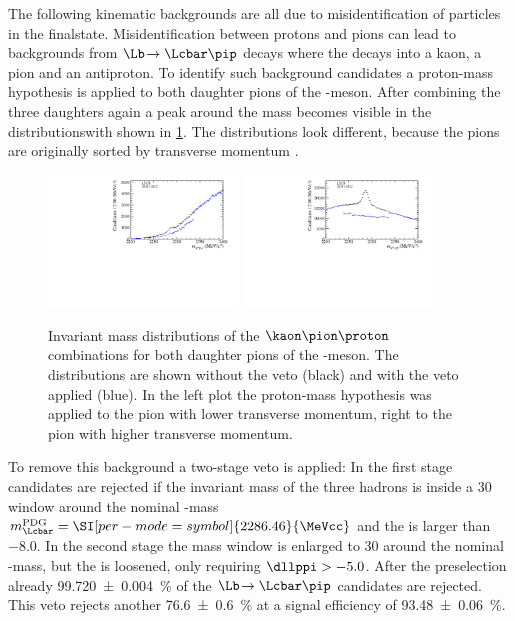 The following kinematic backgrounds are all due to misidentification of particles in the finalstate.
Misidentification between protons and pions can lead to backgrounds from $\Lb\!\to\Lcbar\pip$ decays where the \Lcbar decays into a kaon, a pion and an antiproton.
To identify such background candidates a proton-mass hypothesis is applied to both daughter pions of the \Dm-meson.
After combining the three \D daughters again a peak around the \Lc mass becomes visible in the distributionswith shown in \cref{fig:LcVeto}.
The distributions look different, because the pions are originally sorted by transverse momentum \pt.
\begin{figure}[tbp]
    \centering
    \includegraphics[width=0.45\textwidth]{06selection/figs/LcHypo1.pdf}
    \includegraphics[width=0.45\textwidth]{06selection/figs/LcHypo2.pdf}
    \caption{Invariant mass distributions of the $\kaon\pion\proton$ combinations for both daughter pions of the \Dm-meson.
    The distributions are shown without the veto (black) and with the veto applied (blue).
    In the left plot the proton-mass hypothesis was applied to the pion with lower transverse momentum, right to the pion with higher transverse momentum.}
    \label{fig:LcVeto}
\end{figure}
To remove this background a two-stage veto is applied: In the first stage candidates are rejected if the invariant mass of the three hadrons is inside a \SI[per-mode=symbol]{30}{\MeVcc}  window around the nominal \Lcbar-mass $m_\Lcbar^{\text{PDG}}=\SI[per-mode=symbol]{2286.46}{\MeVcc}$ and the \dllppi is larger than \num{-8.0}.
In the second stage the mass window is enlarged to \SI[per-mode=symbol]{30}{\MeVcc} around the nominal \Lcbar-mass, but the \dllppi is loosened, only requiring $\dllppi>-5.0$.
After the preselection already \SI{99.720\pm0.004}{\percent} of the $\Lb\!\to\Lcbar\pip$ candidates are rejected.
This veto rejects another \SI{76.6\pm0.6}{\percent} at a signal efficiency of \SI{93.48\pm0.06}{\percent}.

